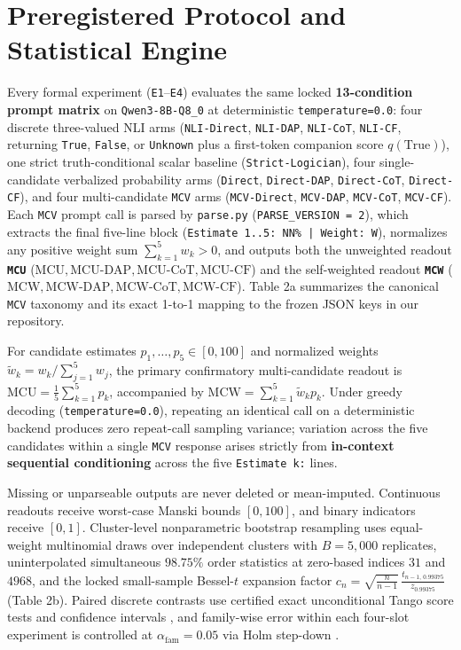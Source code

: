 \documentclass[11pt,a4paper]{article}
\begin{document}
\section{Preregistered Protocol and Statistical Engine}

Every formal experiment (\texttt{E1}--\texttt{E4}) evaluates the same locked \textbf{13-condition prompt matrix} on \texttt{Qwen3-\allowbreak{}8B-\allowbreak{}Q8\_\allowbreak{}0} at deterministic \texttt{temperature=\allowbreak{}0.0}: four discrete three-valued NLI arms (\texttt{NLI-\allowbreak{}Direct}, \texttt{NLI-\allowbreak{}DAP}, \texttt{NLI-\allowbreak{}CoT}, \texttt{NLI-\allowbreak{}CF}, returning \texttt{True}, \texttt{False}, or \texttt{Unknown} plus a first-token companion score $q(\text{True})$), one strict truth-conditional scalar baseline (\texttt{Strict-\allowbreak{}Logician}), four single-candidate verbalized probability arms (\texttt{Direct}, \texttt{Direct-\allowbreak{}DAP}, \texttt{Direct-\allowbreak{}CoT}, \texttt{Direct-\allowbreak{}CF}), and four multi-candidate \texttt{MCV} arms (\texttt{MCV-\allowbreak{}Direct}, \texttt{MCV-\allowbreak{}DAP}, \texttt{MCV-\allowbreak{}CoT}, \texttt{MCV-\allowbreak{}CF}). Each \texttt{MCV} prompt call is parsed by \texttt{parse.py} (\texttt{PARSE\_\allowbreak{}VERSION =\allowbreak{} 2}), which extracts the final five-line block (\texttt{Estimate 1..5: NN\% | Weight: W}), normalizes any positive weight sum $\sum_{k=1}^5 w_k > 0$, and outputs both the unweighted readout \textbf{\texttt{MCU}} ($\text{MCU}, \text{MCU-DAP}, \text{MCU-CoT}, \text{MCU-CF}$) and the self-weighted readout \textbf{\texttt{MCW}} ($\text{MCW}, \text{MCW-DAP}, \text{MCW-CoT}, \text{MCW-CF}$). Table 2a summarizes the canonical \texttt{MCV} taxonomy and its exact 1-to-1 mapping to the frozen JSON keys in our repository.

For candidate estimates $p_1,\dots,p_5 \in [0,100]$ and normalized weights $\tilde{w}_k = w_k / \sum_{j=1}^5 w_j$, the primary confirmatory multi-candidate readout is $\text{MCU} = \frac{1}{5}\sum_{k=1}^5 p_k$, accompanied by $\text{MCW} = \sum_{k=1}^5 \tilde{w}_k p_k$. Under greedy decoding (\texttt{temperature=\allowbreak{}0.0}), repeating an identical call on a deterministic backend produces zero repeat-call sampling variance; variation across the five candidates within a single \texttt{MCV} response arises strictly from \textbf{in-context sequential conditioning} across the five \texttt{Estimate k:} lines.

Missing or unparseable outputs are never deleted or mean-imputed. Continuous readouts receive worst-case Manski bounds $[0, 100]$, and binary indicators receive $[0, 1]$. Cluster-level nonparametric bootstrap resampling uses equal-weight multinomial draws over independent clusters with $B=5{,}000$ replicates, uninterpolated simultaneous $98.75\%$ order statistics at zero-based indices $31$ and $4968$, and the locked small-sample Bessel-$t$ expansion factor $c_n = \sqrt{\frac{n}{n-1}} \, \frac{t_{n-1,\,0.99375}}{z_{0.99375}}$ (Table 2b). Paired discrete contrasts use certified exact unconditional Tango score tests and confidence intervals \citep{tango1998}, and family-wise error within each four-slot experiment is controlled at $\alpha_{\text{fam}}=0.05$ via Holm step-down \citep{holm1979}.
\end{document}
